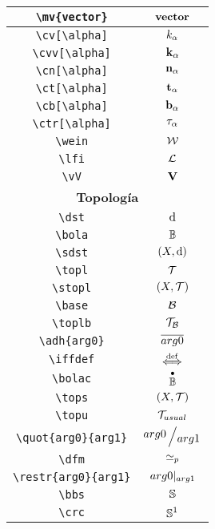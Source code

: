 \begin{longtable}{|c|c|}
\verb|\mv{vector}| & $\displaystyle\mv{vector}$ \\ \midrule 
\verb|\cv[\alpha]| & $\displaystyle\cv[\alpha]$ \\ \midrule 
\verb|\cvv[\alpha]| & $\displaystyle\cvv[\alpha]$ \\ \midrule 
\verb|\cn[\alpha]| & $\displaystyle\cn[\alpha]$ \\ \midrule 
\verb|\ct[\alpha]| & $\displaystyle\ct[\alpha]$ \\ \midrule 
\verb|\cb[\alpha]| & $\displaystyle\cb[\alpha]$ \\ \midrule 
\verb|\ctr[\alpha]| & $\displaystyle\ctr[\alpha]$ \\ \midrule 
\verb|\wein| & $\displaystyle\wein$ \\ \midrule 
\verb|\lfi| & $\displaystyle\lfi$ \\ \midrule 
\verb|\vV| & $\displaystyle\vV$ \\ \midrule 
\bottomrule \multicolumn{2}{|c|}{\textbf{Topología}} \\ \toprule 
\verb|\dst| & $\displaystyle\dst$ \\ \midrule 
\verb|\bola| & $\displaystyle\bola$ \\ \midrule 
\verb|\sdst| & $\displaystyle\sdst$ \\ \midrule 
\verb|\topl| & $\displaystyle\topl$ \\ \midrule 
\verb|\stopl| & $\displaystyle\stopl$ \\ \midrule 
\verb|\base| & $\displaystyle\base$ \\ \midrule 
\verb|\toplb| & $\displaystyle\toplb$ \\ \midrule 
\verb|\adh{arg0}| & $\displaystyle\adh{arg0}$ \\ \midrule 
\verb|\iffdef| & $\displaystyle\iffdef$ \\ \midrule 
\verb|\bolac| & $\displaystyle\bolac$ \\ \midrule 
\verb|\tops| & $\displaystyle\tops$ \\ \midrule 
\verb|\topu| & $\displaystyle\topu$ \\ \midrule 
\verb|\quot{arg0}{arg1}| & $\displaystyle\quot{arg0}{arg1}$ \\ \midrule 
\verb|\dfm| & $\displaystyle\dfm$ \\ \midrule 
\verb|\restr{arg0}{arg1}| & $\displaystyle\restr{arg0}{arg1}$ \\ \midrule 
\verb|\bbs| & $\displaystyle\bbs$ \\ \midrule 
\verb|\crc| & $\displaystyle\crc$ \\ \midrule 

\end{longtable}

